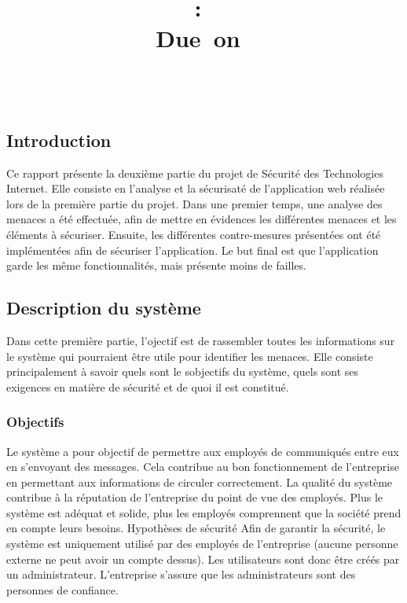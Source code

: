\documentclass{article}
\title{
\vspace{2in}
\textmd{\textbf{\hmwkClass:\ \hmwkTitle}}\\
\normalsize\vspace{0.1in}\small{Due\ on\ \hmwkDueDate}\\
\vspace{0.1in}\large{\textit{\hmwkClassInstructor\ \hmwkClassTime}}
\vspace{3in}
}
\author{\textbf{\hmwkAuthorName}}
\date{} %
\begin{document}
\maketitle



\newpage
\tableofcontents
\newpage


\hypertarget{introduction}{%
\subsection{Introduction}\label{introduction}}

Ce rapport présente la deuxième partie du projet de Sécurité des
Technologies Internet. Elle consiste en l'analyse et la sécurisaté de
l'application web réalisée lors de la première partie du projet. Dans
une premier temps, une analyse des menaces a été effectuée, afin de
mettre en évidences les différentes menaces et les éléments à sécuriser.
Ensuite, les différentes contre-mesures présentées ont été implémentées
afin de sécuriser l'application. Le but final est que l'application
garde les même fonctionnalités, mais présente moins de failles.

\hypertarget{description-du-systuxe8me}{%
\subsection{Description du système}\label{description-du-systuxe8me}}

Dans cette première partie, l'ojectif est de rassembler toutes les
informations sur le système qui pourraient être utile pour identifier
les menaces. Elle consiste principalement à savoir quels sont le
sobjectifs du système, quels sont ses exigences en matière de sécurité
et de quoi il est constitué.

\hypertarget{objectifs}{%
\subsubsection{Objectifs}\label{objectifs}}

Le système a pour objectif de permettre aux employés de communiqués
entre eux en s'envoyant des messages. Cela contribue au bon
fonctionnement de l'entreprise en permettant aux informations de
circuler correctement. La qualité du système contribue à la réputation
de l'entreprise du point de vue des employés. Plus le système est
adéquat et solide, plus les employés comprennent que la société prend en
compte leurs besoins. Hypothèses de sécurité Afin de garantir la
sécurité, le système est uniquement utilisé par des employés de
l'entreprise (aucune personne externe ne peut avoir un compte dessus).
Les utilisateurs sont donc être créés par un administrateur.
L'entreprise s'assure que les administrateurs sont des personnes de
confiance.
\end{document}
